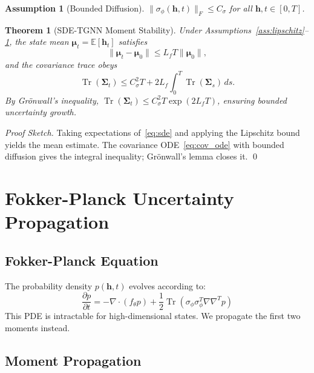 \documentclass[10pt,journal,compsoc]{IEEEtran}
\newcommand{\E}{\mathbb{E}}
\DeclareMathOperator{\Tr}{Tr}
\newtheorem{theorem}{Theorem}
\newtheorem{assumption}{Assumption}
\begin{document}
\begin{assumption}[Bounded Diffusion]
\label{ass:diffusion}
$\|\sigma_\phi(\mathbf{h},t)\|_F \le C_\sigma$ for all $\mathbf{h}, t \in [0,T]$.
\end{assumption}

\begin{theorem}[SDE-TGNN Moment Stability]
\label{thm:stability}
Under Assumptions~\ref{ass:lipschitz}--\ref{ass:diffusion}, the state mean $\boldsymbol{\mu}_t = \E[\mathbf{h}_t]$ satisfies
\[
\|\boldsymbol{\mu}_t - \boldsymbol{\mu}_0\| \le L_f T \|\boldsymbol{\mu}_0\|,
\]
and the covariance trace obeys
\[
\Tr(\boldsymbol{\Sigma}_t) \le C_\sigma^2 T + 2L_f \int_0^T \Tr(\boldsymbol{\Sigma}_s)\,ds.
\]
By Grönwall's inequality, $\Tr(\boldsymbol{\Sigma}_t) \le C_\sigma^2 T \exp(2L_f T)$, ensuring bounded uncertainty growth.
\end{theorem}

\begin{proof}[Proof Sketch]
Taking expectations of~\eqref{eq:sde} and applying the Lipschitz bound yields the mean estimate. The covariance ODE~\eqref{eq:cov_ode} with bounded diffusion gives the integral inequality; Grönwall's lemma closes it. \qed
\end{proof}

\vspace{-0.2cm}
\section{Fokker-Planck Uncertainty Propagation}
\label{sec:fokker_planck}

\vspace{-0.2cm}
\subsection{Fokker-Planck Equation}

The probability density $p(\mathbf{h}, t)$ evolves according to:
\begin{equation}
\frac{\partial p}{\partial t} = -\nabla \cdot (f_\theta p) + \frac{1}{2} \Tr\!\left(\sigma_\phi \sigma_\phi^T \nabla\nabla^T p\right)
\label{eq:fp}
\end{equation}
This PDE is intractable for high-dimensional states. We propagate the first two moments instead.

\vspace{-0.2cm}
\subsection{Moment Propagation}
\end{document}
